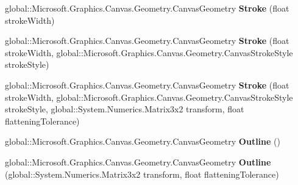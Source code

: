 \begin{DoxyCompactItemize}
\item 
\mbox{\label{interface_microsoft_1_1_graphics_1_1_canvas_1_1_geometry_1_1_i_canvas_geometry_a9bbabef2bcb23c5f82d026f2b161dac4}} 
global\+::\+Microsoft.\+Graphics.\+Canvas.\+Geometry.\+Canvas\+Geometry {\bfseries Stroke} (float stroke\+Width)
\item 
\mbox{\label{interface_microsoft_1_1_graphics_1_1_canvas_1_1_geometry_1_1_i_canvas_geometry_a6ddac698f9eed90fcbbee6f511c98099}} 
global\+::\+Microsoft.\+Graphics.\+Canvas.\+Geometry.\+Canvas\+Geometry {\bfseries Stroke} (float stroke\+Width, global\+::\+Microsoft.\+Graphics.\+Canvas.\+Geometry.\+Canvas\+Stroke\+Style stroke\+Style)
\item 
\mbox{\label{interface_microsoft_1_1_graphics_1_1_canvas_1_1_geometry_1_1_i_canvas_geometry_ac124844233277683b138a1178fe818ad}} 
global\+::\+Microsoft.\+Graphics.\+Canvas.\+Geometry.\+Canvas\+Geometry {\bfseries Stroke} (float stroke\+Width, global\+::\+Microsoft.\+Graphics.\+Canvas.\+Geometry.\+Canvas\+Stroke\+Style stroke\+Style, global\+::\+System.\+Numerics.\+Matrix3x2 transform, float flattening\+Tolerance)
\item 
\mbox{\label{interface_microsoft_1_1_graphics_1_1_canvas_1_1_geometry_1_1_i_canvas_geometry_a7b1a716eb0cbfbd552347d14e00268b7}} 
global\+::\+Microsoft.\+Graphics.\+Canvas.\+Geometry.\+Canvas\+Geometry {\bfseries Outline} ()
\item 
\mbox{\label{interface_microsoft_1_1_graphics_1_1_canvas_1_1_geometry_1_1_i_canvas_geometry_ab685f87179af5eed5881feb2e4aa5c22}} 
global\+::\+Microsoft.\+Graphics.\+Canvas.\+Geometry.\+Canvas\+Geometry {\bfseries Outline} (global\+::\+System.\+Numerics.\+Matrix3x2 transform, float flattening\+Tolerance)
\item 
\mbox{\label{interface_microsoft_1_1_graphics_1_1_canvas_1_1_geometry_1_1_i_canvas_geometry_a1420c252e6995b540a402dc6d2088ff0}} 

\end{DoxyCompactItemize}
